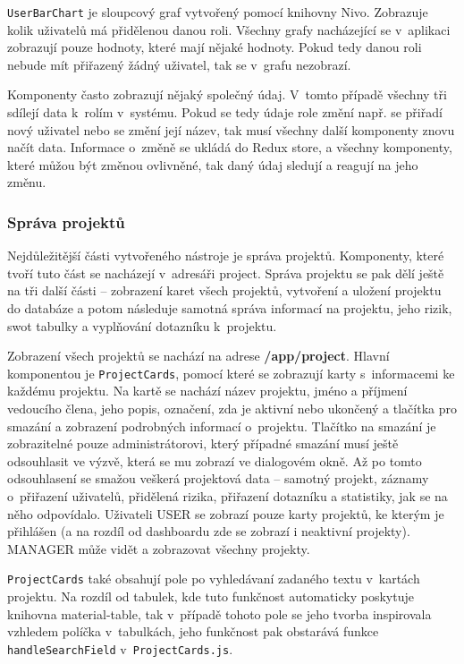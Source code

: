 \texttt{UserBarChart} je sloupcový graf vytvořený pomocí knihovny Nivo. Zobrazuje kolik uživatelů má přidělenou danou roli. Všechny grafy nacházející se v~aplikaci zobrazují pouze hodnoty, které mají nějaké hodnoty. Pokud tedy danou roli nebude mít přiřazený žádný uživatel, tak se v~grafu nezobrazí.

Komponenty často zobrazují nějaký společný údaj. V~tomto případě všechny tři sdílejí data k~rolím v~systému. Pokud se tedy údaje role změní např. se přiřadí nový uživatel nebo se změní její název, tak musí všechny další komponenty znovu načít data. Informace o~změně se ukládá do Redux store, a všechny komponenty, které můžou být změnou ovlivněné, tak daný údaj sledují a reagují na jeho změnu.


\subsubsection *{Správa projektů}

Nejdůležitější části vytvořeného nástroje je správa projektů. Komponenty, které tvoří tuto část se nacházejí v~adresáři project. Správa projektu se pak dělí ještě na tři další části – zobrazení karet všech projektů, vytvoření a uložení projektu do databáze a potom následuje samotná správa informací na projektu, jeho rizik, swot tabulky a vyplňování dotazníku k~projektu.

Zobrazení všech projektů se nachází na adrese \textbf{/app/project}. Hlavní komponentou je \texttt{ProjectCards}, pomocí které se zobrazují karty s~informacemi ke každému projektu. Na kartě se nachází název projektu, jméno a příjmení vedoucího člena, jeho popis, označení, zda je aktivní nebo ukončený a tlačítka pro smazání a zobrazení podrobných informací o~projektu. Tlačítko na smazání je zobrazitelné pouze administrátorovi, který případné smazání musí ještě odsouhlasit ve výzvě, která se mu zobrazí ve dialogovém okně. Až po tomto odsouhlasení se smažou veškerá projektová data – samotný projekt, záznamy o~přiřazení uživatelů, přidělená rizika, přiřazení dotazníku a statistiky, jak se na něho odpovídalo. Uživateli USER se zobrazí pouze karty projektů, ke kterým je přihlášen (a na rozdíl od dashboardu zde se zobrazí i neaktivní projekty). MANAGER může vidět a zobrazovat všechny projekty. 

\texttt{ProjectCards} také obsahují pole po vyhledávaní zadaného textu v~kartách projektu. Na rozdíl od tabulek, kde tuto funkčnost automaticky poskytuje knihovna material-table, tak v~případě tohoto pole se jeho tvorba inspirovala vzhledem políčka v~tabulkách, jeho funkčnost pak obstarává  funkce \texttt{handleSearchField} v~\texttt{ProjectCards.js}.

